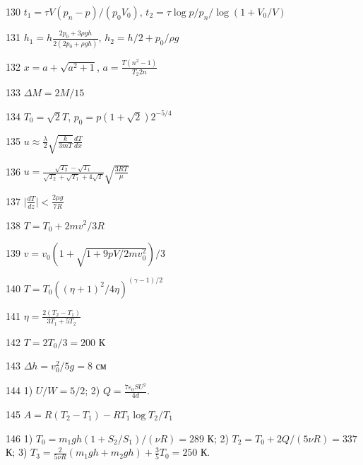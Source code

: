 \begin{Answer}{130}
$t_1 = \tau V(p_n-p)/(p_0V_0)$, $t_2 = \tau \log p/p_n /\log (1+V_0/V)$
\end{Answer}
\begin{Answer}{131}
$h_1 = h \frac{2p_0+3\rho gh}{2(2p_0 + \rho gh)}$, $h_2 = h/2 + p_0/\rho g$
\end{Answer}
\begin{Answer}{132}
$x = a + \sqrt{a^2+1}$, $a = \frac{T (n^2 - 1)}{T_2 2n}$
\end{Answer}
\begin{Answer}{133}
$\Delta M = 2M/15$
\end{Answer}
\begin{Answer}{134}
$T_0 = \sqrt{2}T$, $p_0=p(1+\sqrt{2})2^{-5/4}$
\end{Answer}
\begin{Answer}{135}
$u \approx \frac{\lambda}{2}\sqrt{\frac{k}{3mT}}\frac{dT}{dx}$
\end{Answer}
\begin{Answer}{136}
$u = \frac{\sqrt{T_2}-\sqrt{T_1}}{\sqrt{T_2}+\sqrt{T_1}+4\sqrt{T}} \sqrt{\frac{3RT}{\mu}}$
\end{Answer}
\begin{Answer}{137}
$\mid \frac{dT}{dz} \mid < \frac{2\mu g}{7R}$
\end{Answer}
\begin{Answer}{138}
$T=T_0+2mv^2/3R$
\end{Answer}
\begin{Answer}{139}
$v = v_0\left( 1 + \sqrt{1+9pV/2mv_0^2} \right)/3$
\end{Answer}
\begin{Answer}{140}
$T=T_0 \left( (\eta + 1)^2/4 \eta \right)^{(\gamma-1)/2}$
\end{Answer}
\begin{Answer}{141}
$\eta = \frac{2(T_2-T_1)}{3T_1+5T_2}$
\end{Answer}
\begin{Answer}{142}
$T=2T_0/3 = 200$ К
\end{Answer}
\begin{Answer}{143}
$\Delta h = v_0^2 / 5g = 8$ см
\end{Answer}
\begin{Answer}{144}
1) $U/W=5/2$; 2) $Q=\frac{7\varepsilon_0 SU^2}{4d}$.
\end{Answer}
\begin{Answer}{145}
$A= R(T_2-T_1)-RT_1 \log T_2/T_1$
\end{Answer}
\begin{Answer}{146}
1) $T_0 = m_1gh(1+S_2/S_1)/(\nu R) = 289$ К;
2) $T_2 = T_0 + 2Q/(5\nu R) = 337$ К;
3) $T_3 = \frac{2}{5\nu R}(m_1 gh + m_2 gh)+ \frac{3}{5}T_0 = 250$ К.
\end{Answer}
